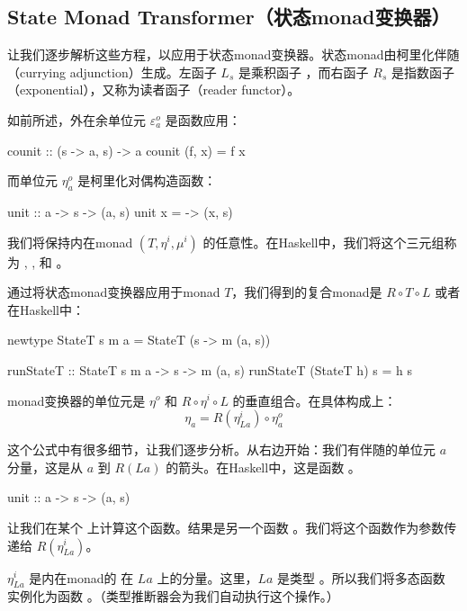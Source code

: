 \documentclass[DaoFP]{subfiles}
\begin{document}
    \subsection{State Monad Transformer（状态monad变换器）}

    让我们逐步解析这些方程，以应用于状态monad变换器。状态monad由柯里化伴随（currying adjunction）生成。左函子 $L_s$ 是乘积函子 ，而右函子 $R_s$ 是指数函子（exponential），又称为读者函子（reader functor）。

    如前所述，外在余单位元 $\varepsilon^o_a$ 是函数应用：
    \begin{haskell}
        counit :: (s -> a, s) -> a
        counit (f, x) = f x
    \end{haskell}
    而单位元 $\eta^o_a$ 是柯里化对偶构造函数：
    \begin{haskell}
        unit :: a -> s -> (a, s)
        unit x = \s -> (x, s)
    \end{haskell}

    我们将保持内在monad $(T, \eta^i, \mu^i)$ 的任意性。在Haskell中，我们将这个三元组称为 , , 和 。

    通过将状态monad变换器应用于monad $T$，我们得到的复合monad是 $R \circ T \circ L$ 或者在Haskell中：
    \begin{haskell}
        newtype StateT s m a = StateT (s -> m (a, s))
    \end{haskell}

    \begin{haskell}
        runStateT :: StateT s m a -> s -> m (a, s)
        runStateT (StateT h) s = h s
    \end{haskell}

    monad变换器的单位元是 $\eta^o$ 和 $R \circ \eta^i \circ L$ 的垂直组合。在具体构成上：
    \[ \eta_a = R(\eta^i_{L a}) \circ \eta^o_a \]

    这个公式中有很多细节，让我们逐步分析。从右边开始：我们有伴随的单位元 $a$ 分量，这是从 $a$ 到 $R (L a)$ 的箭头。在Haskell中，这是函数 。
    \begin{haskell}
        unit :: a -> s -> (a, s)
    \end{haskell}
    让我们在某个  上计算这个函数。结果是另一个函数 。我们将这个函数作为参数传递给 $R(\eta^i_{L a})$。

    $\eta^i_{L a}$ 是内在monad的  在 $L a$ 上的分量。这里，$L a$ 是类型 。所以我们将多态函数  实例化为函数 。（类型推断器会为我们自动执行这个操作。）
\end{document}
